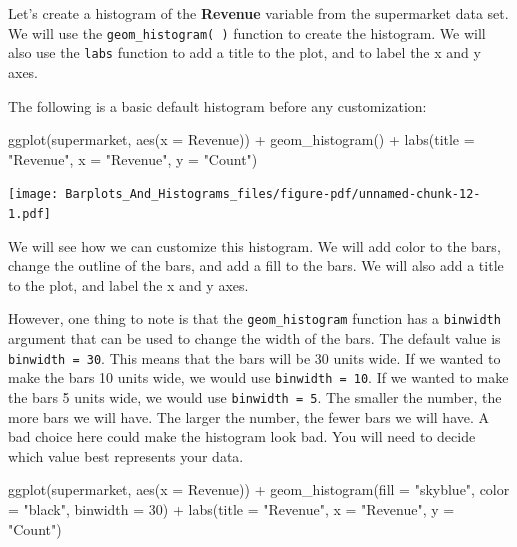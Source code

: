 \documentclass[
  letterpaper,
  DIV=11,
  numbers=noendperiod]{scrreprt}
\newenvironment{Shaded}{\begin{snugshade}}{\end{snugshade}}
\newcommand{\AttributeTok}[1]{\textcolor[rgb]{0.40,0.45,0.13}{#1}}
\newcommand{\DecValTok}[1]{\textcolor[rgb]{0.68,0.00,0.00}{#1}}
\newcommand{\FunctionTok}[1]{\textcolor[rgb]{0.28,0.35,0.67}{#1}}
\newcommand{\NormalTok}[1]{\textcolor[rgb]{0.00,0.23,0.31}{#1}}
\newcommand{\SpecialCharTok}[1]{\textcolor[rgb]{0.37,0.37,0.37}{#1}}
\newcommand{\StringTok}[1]{\textcolor[rgb]{0.13,0.47,0.30}{#1}}
\begin{document}
Let's create a histogram of the \textbf{Revenue} variable from the
supermarket data set. We will use the \texttt{geom\_histogram(\ )}
function to create the histogram. We will also use the \texttt{labs}
function to add a title to the plot, and to label the x and y axes.

The following is a basic default histogram before any customization:

\begin{Shaded}
\begin{Highlighting}[]
\FunctionTok{ggplot}\NormalTok{(supermarket, }\FunctionTok{aes}\NormalTok{(}\AttributeTok{x =} \StringTok{\textasciigrave{}}\AttributeTok{Revenue}\StringTok{\textasciigrave{}}\NormalTok{)) }\SpecialCharTok{+}
  \FunctionTok{geom\_histogram}\NormalTok{() }\SpecialCharTok{+}
  \FunctionTok{labs}\NormalTok{(}\AttributeTok{title =} \StringTok{"Revenue"}\NormalTok{,}
       \AttributeTok{x =} \StringTok{"Revenue"}\NormalTok{,}
       \AttributeTok{y =} \StringTok{"Count"}\NormalTok{)}
\end{Highlighting}
\end{Shaded}

\texttt{[image: Barplots\_And\_Histograms\_files/figure-pdf/unnamed-chunk-12-1.pdf]}

We will see how we can customize this histogram. We will add color to
the bars, change the outline of the bars, and add a fill to the bars. We
will also add a title to the plot, and label the x and y axes.

However, one thing to note is that the \texttt{geom\_histogram} function
has a \texttt{binwidth} argument that can be used to change the width of
the bars. The default value is \texttt{binwidth\ =\ 30}. This means that
the bars will be 30 units wide. If we wanted to make the bars 10 units
wide, we would use \texttt{binwidth\ =\ 10}. If we wanted to make the
bars 5 units wide, we would use \texttt{binwidth\ =\ 5}. The smaller the
number, the more bars we will have. The larger the number, the fewer
bars we will have. A bad choice here could make the histogram look bad.
You will need to decide which value best represents your data.

\begin{Shaded}
\begin{Highlighting}[]
\FunctionTok{ggplot}\NormalTok{(supermarket, }\FunctionTok{aes}\NormalTok{(}\AttributeTok{x =} \StringTok{\textasciigrave{}}\AttributeTok{Revenue}\StringTok{\textasciigrave{}}\NormalTok{)) }\SpecialCharTok{+}
  \FunctionTok{geom\_histogram}\NormalTok{(}\AttributeTok{fill =} \StringTok{"skyblue"}\NormalTok{, }\AttributeTok{color =} \StringTok{"black"}\NormalTok{, }\AttributeTok{binwidth =} \DecValTok{30}\NormalTok{) }\SpecialCharTok{+}
  \FunctionTok{labs}\NormalTok{(}\AttributeTok{title =} \StringTok{"Revenue"}\NormalTok{,}
       \AttributeTok{x =} \StringTok{"Revenue"}\NormalTok{,}
       \AttributeTok{y =} \StringTok{"Count"}\NormalTok{)}
\end{Highlighting}
\end{Shaded}
\end{document}
